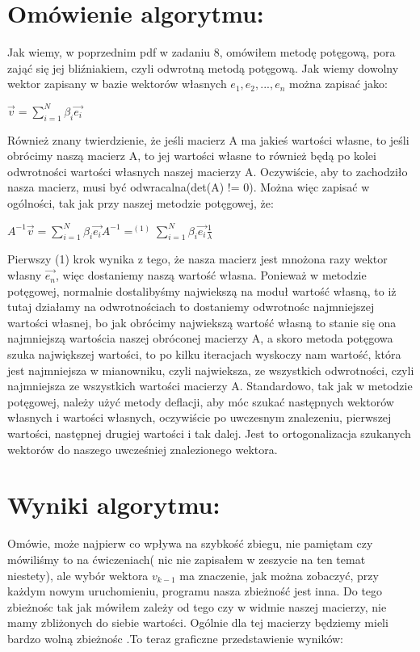 \documentclass[12pt]{article}
\begin{document}
\section{Omówienie algorytmu: }
Jak wiemy, w poprzednim pdf w zadaniu 8, omówiłem metodę potęgową, pora zająć się jej bliźniakiem, czyli odwrotną metodą potęgową. Jak wiemy dowolny wektor zapisany w bazie wektorów własnych ${e_{1},e_{2},...,e_{n}}$ można zapisać jako:
\begin{center}
    \begin{math}
        \vec{v} = \sum_{i=1}^{N}\beta_{i}\vec{e_{i}}
    \end{math}
\end{center}
Również znany twierdzienie, że jeśli macierz A ma jakieś wartości własne, to jeśli obrócimy naszą macierz A, to jej wartości własne to również będą po kolei odwrotności wartości własnych naszej macierzy A. Oczywiście, aby to zachodziło nasza macierz, musi być odwracalna(det(A) != 0). Można więc zapisać w ogólności, tak jak przy naszej metodzie potęgowej, że:
\begin{center}
    \begin{math}
        A^{-1}\vec{v} = \sum_{i=1}^{N}\beta_{i}\vec{e_{i}}A^{-1} =^{(1)} \sum_{i=1}^{N}\beta_{i}\vec{e_{i}}\frac{1}{\lambda}
    \end{math}
    \end{center}
Pierwszy (1) krok wynika z tego, że nasza macierz jest mnożona razy wektor własny $\vec{e_{n}}$, więc dostaniemy naszą wartość własna. Ponieważ w metodzie potęgowej, normalnie dostalibyśmy najwiekszą na moduł wartość własną, to iż tutaj działamy na odwrotnościach to dostaniemy odwrotnośc najmniejszej wartości własnej, bo jak obrócimy najwiekszą wartość własną to stanie się ona najmniejszą wartościa naszej obróconej macierzy A, a skoro metoda potęgowa szuka największej wartości, to po kilku iteracjach wyskoczy nam wartość, która jest najmniejsza w mianowniku, czyli najwieksza, ze wszystkich odwrotności, czyli najmniejsza ze wszystkich wartości macierzy A. Standardowo, tak jak w metodzie potęgowej, należy użyć metody deflacji, aby móc szukać następnych wektorów własnych i wartości własnych, oczywiście po uwczesnym znalezeniu, pierwszej wartości, następnej drugiej wartości i tak dalej. Jest to ortogonalizacja szukanych wektorów do naszego uwcześniej znalezionego wektora.
\section{Wyniki algorytmu: }
Omówie, może najpierw co wpływa na szybkość zbiegu, nie pamiętam czy mówiliśmy to na ćwiczeniach( nic nie zapisałem w zeszycie na ten temat niestety), ale wybór wektora $v_{k-1}$ ma znaczenie, jak można zobaczyć, przy każdym nowym uruchomieniu, programu nasza zbieżność jest inna. Do tego zbieżnośc tak jak mówiłem zależy od tego czy w widmie naszej macierzy, nie mamy zbliżonych do siebie wartości. Ogólnie dla tej macierzy będziemy mieli bardzo wolną zbieżnośc .To teraz graficzne przedstawienie wyników:
\end{document}
